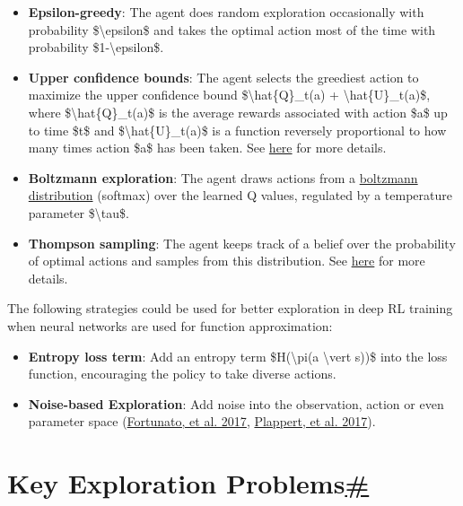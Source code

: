 \begin{itemize}
\tightlist
\item
  \textbf{Epsilon-greedy}: The agent does random exploration occasionally with probability \$\textbackslash epsilon\$ and takes the optimal action most of the time with probability \$1-\textbackslash epsilon\$.
\item
  \textbf{Upper confidence bounds}: The agent selects the greediest action to maximize the upper confidence bound \$\textbackslash hat\{Q\}\_t(a) + \textbackslash hat\{U\}\_t(a)\$, where \$\textbackslash hat\{Q\}\_t(a)\$ is the average rewards associated with action \$a\$ up to time \$t\$ and \$\textbackslash hat\{U\}\_t(a)\$ is a function reversely proportional to how many times action \$a\$ has been taken. See \href{https://lilianweng.github.io/posts/2018-01-23-multi-armed-bandit/\#upper-confidence-bounds}{here} for more details.
\item
  \textbf{Boltzmann exploration}: The agent draws actions from a \href{https://en.wikipedia.org/wiki/Boltzmann_distribution}{boltzmann distribution} (softmax) over the learned Q values, regulated by a temperature parameter \$\textbackslash tau\$.
\item
  \textbf{Thompson sampling}: The agent keeps track of a belief over the probability of optimal actions and samples from this distribution. See \href{https://lilianweng.github.io/posts/2018-01-23-multi-armed-bandit/\#thompson-sampling}{here} for more details.
\end{itemize}

The following strategies could be used for better exploration in deep RL training when neural networks are used for function approximation:

\begin{itemize}
\tightlist
\item
  \textbf{Entropy loss term}: Add an entropy term \$H(\textbackslash pi(a \textbackslash vert s))\$ into the loss function, encouraging the policy to take diverse actions.
\item
  \textbf{Noise-based Exploration}: Add noise into the observation, action or even parameter space (\href{https://arxiv.org/abs/1706.10295}{Fortunato, et al. 2017}, \href{https://arxiv.org/abs/1706.01905}{Plappert, et al. 2017}).
\end{itemize}

\section{\texorpdfstring{Key Exploration Problems\hyperref[key-exploration-problems]{\#}}{Key Exploration Problems\#}}\label{key-exploration-problems}

